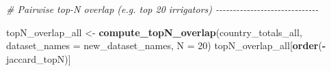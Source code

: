 \documentclass[
  11pt,
]{article}
\newenvironment{Shaded}{\begin{snugshade}}{\end{snugshade}}
\newcommand{\AttributeTok}[1]{\textcolor[rgb]{0.13,0.29,0.53}{#1}}
\newcommand{\CommentTok}[1]{\textcolor[rgb]{0.56,0.35,0.01}{\textit{#1}}}
\newcommand{\DecValTok}[1]{\textcolor[rgb]{0.00,0.00,0.81}{#1}}
\newcommand{\FunctionTok}[1]{\textcolor[rgb]{0.13,0.29,0.53}{\textbf{#1}}}
\newcommand{\NormalTok}[1]{#1}
\newcommand{\OtherTok}[1]{\textcolor[rgb]{0.56,0.35,0.01}{#1}}
\newcommand{\SpecialCharTok}[1]{\textcolor[rgb]{0.81,0.36,0.00}{\textbf{#1}}}
\begin{document}
\begin{Shaded}
\begin{Highlighting}[]
\CommentTok{\# Pairwise top{-}N overlap (e.g. top 20 irrigators) {-}{-}{-}{-}{-}{-}{-}{-}{-}{-}{-}{-}{-}{-}{-}{-}{-}{-}{-}{-}{-}{-}{-}{-}{-}{-}{-}{-}{-}{-}}

\NormalTok{topN\_overlap\_all }\OtherTok{\textless{}{-}} \FunctionTok{compute\_topN\_overlap}\NormalTok{(country\_totals\_all,}
                                         \AttributeTok{dataset\_names =}\NormalTok{ new\_dataset\_names,}
                                         \AttributeTok{N =} \DecValTok{20}\NormalTok{)}
\NormalTok{topN\_overlap\_all[}\FunctionTok{order}\NormalTok{(}\SpecialCharTok{{-}}\NormalTok{jaccard\_topN)]}
\end{Highlighting}
\end{Shaded}
\end{document}
